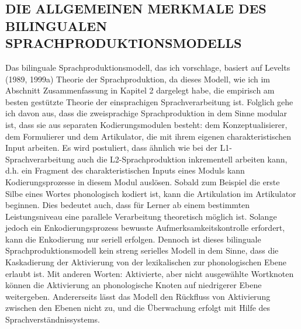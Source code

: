 \documentclass[
  letterpaper,
]{scrbook}
\begin{document}
\hypertarget{die-allgemeinen-merkmale-des-bilingualen-sprachproduktionsmodells}{%
\subsection{DIE ALLGEMEINEN MERKMALE DES BILINGUALEN
SPRACHPRODUKTIONSMODELLS}\label{die-allgemeinen-merkmale-des-bilingualen-sprachproduktionsmodells}}

Das bilinguale Sprachproduktionsmodell, das ich vorschlage, basiert auf
Levelts (1989, 1999a) Theorie der Sprachproduktion, da dieses Modell,
wie ich im Abschnitt Zusammenfassung in Kapitel 2 dargelegt habe, die
empirisch am besten gestützte Theorie der einsprachigen
Sprachverarbeitung ist. Folglich gehe ich davon aus, dass die
zweisprachige Sprachproduktion in dem Sinne modular ist, dass sie aus
separaten Kodierungsmodulen besteht: dem Konzeptualisierer, dem
Formulierer und dem Artikulator, die mit ihrem eigenen
charakteristischen Input arbeiten. Es wird postuliert, dass ähnlich wie
bei der L1-Sprachverarbeitung auch die L2-Sprachproduktion inkrementell
arbeiten kann, d.h. ein Fragment des charakteristischen Inputs eines
Moduls kann Kodierungsprozesse in diesem Modul auslösen. Sobald zum
Beispiel die erste Silbe eines Wortes phonologisch kodiert ist, kann die
Artikulation im Artikulator beginnen. Dies bedeutet auch, dass für
Lerner ab einem bestimmten Leistungsniveau eine parallele Verarbeitung
theoretisch möglich ist. Solange jedoch ein Enkodierungsprozess bewusste
Aufmerksamkeitskontrolle erfordert, kann die Enkodierung nur seriell
erfolgen. Dennoch ist dieses bilinguale Sprachproduktionsmodell kein
streng serielles Modell in dem Sinne, dass die Kaskadierung der
Aktivierung von der lexikalischen zur phonologischen Ebene erlaubt ist.
Mit anderen Worten: Aktivierte, aber nicht ausgewählte Wortknoten können
die Aktivierung an phonologische Knoten auf niedrigerer Ebene
weitergeben. Andererseits lässt das Modell den Rückfluss von Aktivierung
zwischen den Ebenen nicht zu, und die Überwachung erfolgt mit Hilfe des
Sprachverständnissystems.
\end{document}
